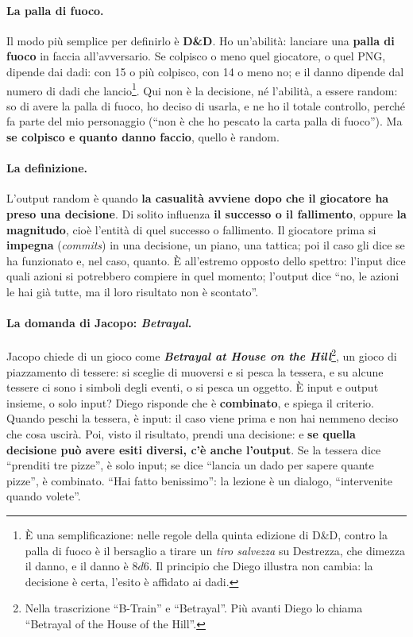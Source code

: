 \paragraph{La palla di fuoco.} Il modo più semplice per definirlo è \textbf{D\&D}. Ho
un'abilità: lanciare una \textbf{palla di fuoco} in faccia all'avversario. Se colpisco o meno
quel giocatore, o quel PNG, dipende dai dadi: con 15 o più colpisco, con 14 o meno no; e il
danno dipende dal numero di dadi che lancio\footnote{È una semplificazione: nelle regole
della quinta edizione di D\&D, contro la palla di fuoco è il bersaglio a tirare un
\emph{tiro salvezza} su Destrezza, che dimezza il danno, e il danno è $8d6$. Il principio
che Diego illustra non cambia: la decisione è certa, l'esito è affidato ai dadi.}. Qui non è
la decisione, né l'abilità, a essere random: so di avere la palla di fuoco, ho deciso di
usarla, e ne ho il totale controllo, perché fa parte del mio personaggio (``non è che ho
pescato la carta palla di fuoco''). Ma \textbf{se colpisco e quanto danno faccio}, quello è
random.

\paragraph{La definizione.} L'output random è quando \textbf{la casualità avviene dopo che il
giocatore ha preso una decisione}. Di solito influenza \textbf{il successo o il fallimento},
oppure \textbf{la magnitudo}, cioè l'entità di quel successo o fallimento. Il giocatore prima
si \textbf{impegna} (\emph{commits}) in una decisione, un piano, una tattica; poi il caso gli
dice se ha funzionato e, nel caso, quanto. È all'estremo opposto dello spettro: l'input dice
quali azioni si potrebbero compiere in quel momento; l'output dice ``no, le azioni le hai già
tutte, ma il loro risultato non è scontato''.

\paragraph{La domanda di Jacopo: \emph{Betrayal}.} Jacopo chiede di un gioco come
\textbf{\emph{Betrayal at House on the Hill}}\footnote{Nella trascrizione ``B-Train'' e
``Betrayal''. Più avanti Diego lo chiama ``Betrayal of the House of the Hill''.}, un gioco di
piazzamento di tessere: si sceglie di muoversi e si pesca la tessera, e su alcune tessere ci
sono i simboli degli eventi, o si pesca un oggetto. È input e output insieme, o solo input?
Diego risponde che è \textbf{combinato}, e spiega il criterio. Quando peschi la tessera, è
input: il caso viene prima e non hai nemmeno deciso che cosa uscirà. Poi, visto il risultato,
prendi una decisione: e \textbf{se quella decisione può avere esiti diversi, c'è anche
l'output}. Se la tessera dice ``prenditi tre pizze'', è solo input; se dice ``lancia un dado
per sapere quante pizze'', è combinato. ``Hai fatto benissimo'': la lezione è un dialogo,
``intervenite quando volete''.

